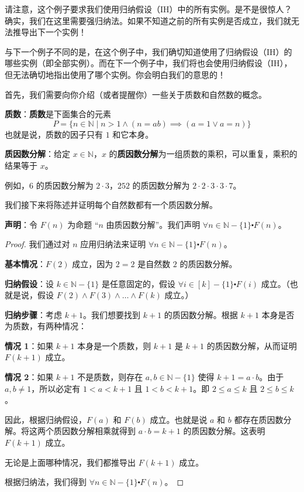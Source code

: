 请注意，这个例子要求我们使用归纳假设（IH）中的所有实例。是不是很惊人？确实，我们在这里需要强归纳法。如果不知道之前的所有实例是否成立，我们就无法推导出下一个实例！

与下一个例子不同的是，在这个例子中，我们确切知道使用了归纳假设（IH）的哪些实例（即全部实例）。而在下一个例子中，我们将也会使用归纳假设（IH），但无法确切地指出使用了哪个实例。你会明白我们的意思的！\\

\begin{example}\label{ex:example5.4.3}
    首先，我们需要向你介绍（或者提醒你）一些关于质数和自然数的概念。

    \textbf{质数}：\textbf{质数}是下面集合的元素
    \[P = \{n \in \mathbb{N} \mid n > 1 \land (n = ab) \implies (a = 1 \lor a = n)\}\]
    也就是说，质数的因子只有 $1$ 和它本身。

    \textbf{质因数分解}：给定 $x \in \mathbb{N}$，$x$ 的\textbf{质因数分解}为一组质数的乘积，可以重复，乘积的结果等于 $x$。

    例如，$6$ 的质因数分解为 $2 \cdot 3$，$252$ 的质因数分解为 $2 \cdot 2 \cdot 3 \cdot 3 \cdot 7$。

    我们接下来将陈述并证明每个自然数都有一个质因数分解。

    \textbf{声明}：令 $F(n)$ 为命题 ``$n$ 由质因数分解''。我们声明 $\forall n \in \mathbb{N} - \{1\} \centerdot F(n)$。
\end{example}

\begin{proof}
    我们通过对 $n$ 应用归纳法来证明 $\forall n \in \mathbb{N} - \{1\} \centerdot F(n)$。

    \textbf{基本情况}：$F(2)$ 成立，因为 $2 = 2$ 是自然数 $2$ 的质因数分解。

    \textbf{归纳假设}：设 $k \in \mathbb{N} - \{1\}$ 是任意固定的，假设 $\forall i \in [k]-\{1\} \centerdot F(i)$ 成立。（也就是说，假设 $F(2) \land F(3) \land \dots \land F(k)$ 成立。）

    \textbf{归纳步骤}：考虑 $k+1$。我们想要找到 $k+1$ 的质因数分解。根据 $k+1$ 本身是否为质数，有两种情况：

    \textbf{情况 1}：如果 $k+1$ 本身是一个质数，则 $k+1$ 是 $k+1$ 的质因数分解，从而证明 $F(k+1)$ 成立。

    \textbf{情况 2}：如果 $k+1$ 不是质数，则存在 $a, b \in \mathbb{N} - \{1\}$ 使得 $k+1 = a \cdot b$。由于 $a, b \neq 1$，所以必定有 $1 < a < k+1$ 且 $1 < b < k+1$。即 $2 \le a \le k$ 且 $2 \le b \le k$。

    因此，根据归纳假设，$F(a)$ 和 $F(b)$ 成立。也就是说 $a$ 和 $b$ 都存在质因数分解。将这两个质因数分解相乘就得到 $a \cdot b = k+1$ 的质因数分解。这表明 $F(k+1)$ 成立。

    无论是上面哪种情况，我们都推导出 $F(k+1)$ 成立。

    根据归纳法，我们得到 $\forall n \in \mathbb{N} - \{1\} \centerdot F(n)$。
\end{proof}


